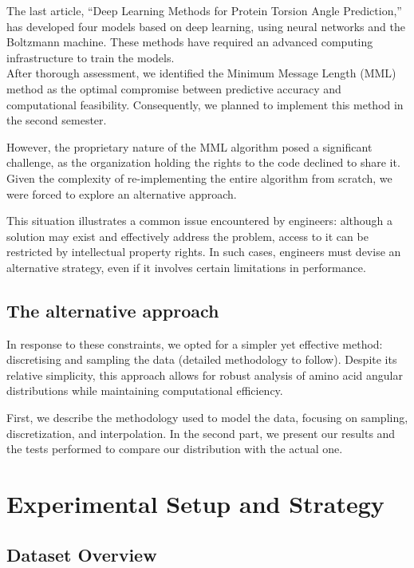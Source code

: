 \documentclass{article}
\begin{document}
The last article, “Deep Learning Methods for Protein Torsion Angle Prediction,” has developed four models based on deep learning, using neural networks and the Boltzmann machine. These methods have required an advanced computing infrastructure to train the models.\\

After thorough assessment, we identified the Minimum Message Length (MML) method as the optimal compromise between predictive accuracy and computational feasibility. Consequently, we planned to implement this method in the second semester.  

However, the proprietary nature of the MML algorithm posed a significant challenge, as the organization holding the rights to the code declined to share it. Given the complexity of re-implementing the entire algorithm from scratch, we were forced to explore an alternative approach.  

This situation illustrates a common issue encountered by engineers: although a solution may exist and effectively address the problem, access to it can be restricted by intellectual property rights. In such cases, engineers must devise an alternative strategy, even if it involves certain limitations in performance.


\subsection*{The alternative approach} 
In response to these constraints, we opted for a simpler yet effective method: discretising and sampling the data (detailed methodology to follow). Despite its relative simplicity, this approach allows for robust analysis of amino acid angular distributions while maintaining computational efficiency.  

First, we describe the methodology used to model the data, focusing on sampling, discretization, and interpolation. In the second part, we present our results and the tests performed to compare our distribution with the actual one. 

\newpage

\section{Experimental Setup and Strategy}

\subsection{Dataset Overview}
\end{document}
